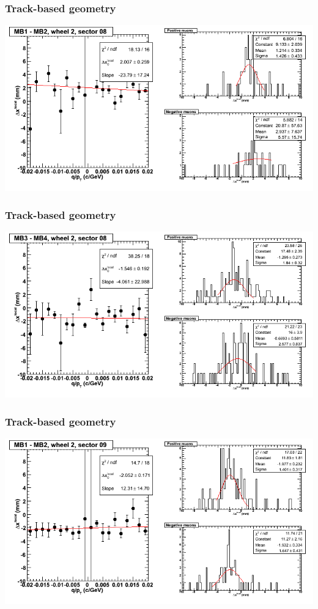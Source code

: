 \documentclass[compress]{beamer}
\begin{document}
\begin{frame}
\frametitle{Track-based geometry}
\includegraphics[width=\linewidth]{NOV4_segdiffs/dt13_resid_E_08_12.png}
\end{frame}

\begin{frame}
\frametitle{Track-based geometry}
\includegraphics[width=\linewidth]{NOV4_segdiffs/dt13_resid_E_08_34.png}
\end{frame}

\begin{frame}
\frametitle{Track-based geometry}
\includegraphics[width=\linewidth]{NOV4_segdiffs/dt13_resid_E_09_12.png}
\end{frame}
\end{document}
